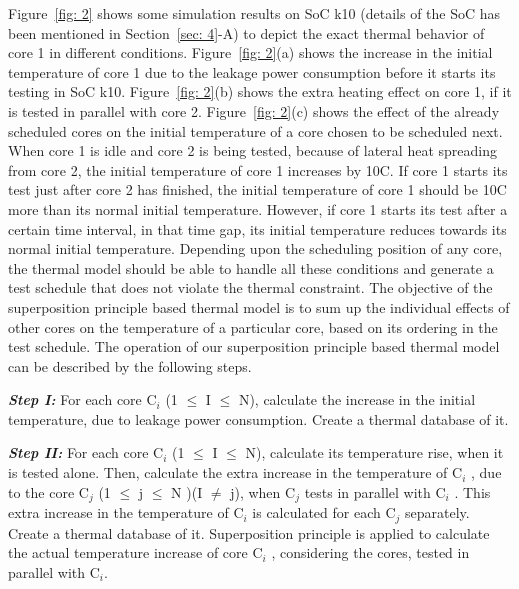 \documentclass[conference]{IEEEtran}
\begin{document}
	\par 
	Figure~\ref{fig: 2} shows some simulation results on SoC k10
(details of the SoC has been mentioned in Section~\ref{sec: 4}-A)
to depict the exact thermal behavior of core 1 in different
conditions. Figure~\ref{fig: 2}(a) shows the increase in the initial
temperature of core 1 due to the leakage power consumption
before it starts its testing in SoC k10. Figure~\ref{fig: 2}(b) shows the
extra heating effect on core 1, if it is tested in parallel with core
2. Figure~\ref{fig: 2}(c) shows the effect of the already scheduled cores
on the initial temperature of a core chosen to be scheduled
next. When core 1 is idle and core 2 is being tested, because
of lateral heat spreading from core 2, the initial temperature
of core 1 increases by 10\degree C. If core 1 starts its test just after
core 2 has finished, the initial temperature of core 1 should
be 10\degree C more than its normal initial temperature. However, if
core 1 starts its test after a certain time interval, in that time
gap, its initial temperature reduces towards its normal initial
temperature. Depending upon the scheduling position of any
core, the thermal model should be able to handle all these
conditions and generate a test schedule that does not violate the
thermal constraint. The objective of the superposition principle
based thermal model is to sum up the individual effects of
other cores on the temperature of a particular core, based
on its ordering in the test schedule. The operation of our
superposition principle based thermal model can be described
by the following steps.\\

	\par
	\textbf{\textit{Step I:}} For each core C$_{i}$ (1 $\leq$ I $\leq$ N), calculate the
increase in the initial temperature, due to leakage power
consumption. Create a thermal database of it.\\

	\par
	\textbf{\textit{Step II:}} For each core C$_{i}$ (1 $\leq$ I $\leq$ N), calculate its
temperature rise, when it is tested alone. Then, calculate the
extra increase in the temperature of C$_{i}$ , due to the core C$_{j}$ (1 $\leq$
j $\leq$ N )(I $\neq$ j), when C$_{j}$ tests in parallel with C$_{i}$ . This
extra increase in the temperature of C$_{i}$ is calculated for each
C$_{j}$ separately. Create a thermal database of it. Superposition
principle is applied to calculate the actual temperature increase
of core C$_{i}$ , considering the cores, tested in parallel with C$_{i}$.\\
\end{document}
